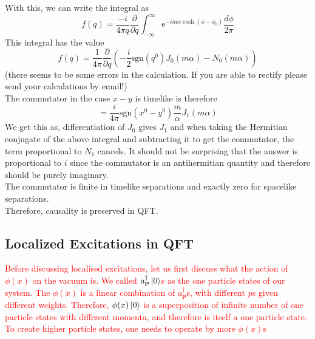 \documentclass[11pt]{article}
\newcommand{\del}{\partial}
\newcommand{\e}{\mathrm{e}}
\newcommand{\adag}[1]{a^\dagger_\mathbf{#1}}
\numberwithin{equation}{section}
\begin{document}
    With this, we can write the integral as 
    \begin{equation*}
        f(q) = \frac{-i}{4\pi q} \frac{\del}{\del q} \int_{-\infty}^\infty \e^{-im\alpha \cosh(\phi -\phi_0)} \frac{d\phi}{2\pi} 
    \end{equation*}
    This integral has the value 
    \begin{equation*}
        f(q) = \frac{1}{4\pi} \frac{\del}{\del q} \left(-\frac{i}{2} \mathrm{sgn}(q^0) J_0(m\alpha) - N_0(m\alpha)\right)
    \end{equation*}
    (there seems to be some errors in the calculation. If you are able to rectify please send your calculations by email!)\\
    The commutator in the case \(x-y\) is timelike is therefore 
    \begin{equation*}
        [\phi(x), \phi(y)] = \frac{i}{4\pi} \mathrm{sgn}(x^0 - y^0) \frac{m}{\alpha} J_1(m\alpha)
    \end{equation*}
    We get this as, differentiation of \(J_0\) gives \(J_1\) and when taking the Hermitian conjugate of the above integral and subtracting it to get the commutator, the term proportional to \(N_1\) cancels. It should not be surprising that the answer is proportional to \(i\) since the commutator is an antihermitian quantity and therefore should be purely imaginary. \\

    The commutator is finite in timelike separations and exactly zero for spacelike separations. \\
    Therefore, causality is preserved in QFT.
    
    \subsection{Localized Excitations in QFT}
    \textcolor{red}{Before discussing localised excitations, let us first discuss what the action of \(\phi(x)\) on the vacuum is. We called \(\adag{p}\ket{0}\)s as the one particle states of our system. The \(\phi(x)\) is a linear combination of \(\adag{p}\)s, with different \(p\)s given different weights. Therefore, \(\phi(x)\ket{0}\) is a superposition of infinite number of one particle states with different momenta, and therefore is itself a one particle state. To create higher particle states, one needs to operate by more \(\phi(x)\)s \\}
\end{document}
